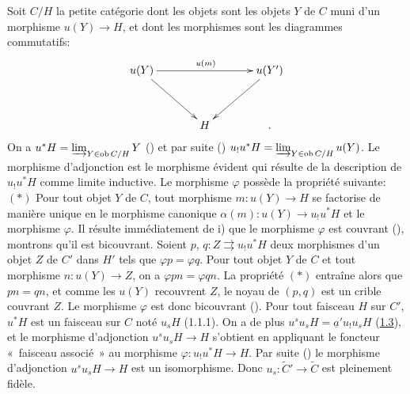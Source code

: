 \documentclass[10pt]{../fichiers-configuration-latex/smfart}
\begin{document}
Soit $C/H$ la petite catégorie dont les objets sont les objets
$Y$ de $C$ muni d'un morphisme $u(Y)\rightarrow H$, et dont les
morphismes sont les diagrammes commutatifs:
\[
\xymatrix@=1.25cm{
u(Y) \ar[rr]^{u(m)} \ar[rd]&     &u(Y')\ar[ld]\\
     &  H  & .
}
\]
On a $u^{\ast}H=\varinjlim_{Y\in \operatorname{ob} C/H} Y$ () et
par suite () $u_{!}u^{\ast}H=\varinjlim_{Y\in \operatorname{ob}
C/H} u(Y)$. Le morphisme d'adjonction est le morphisme évident qui
résulte de la description de $u_{!}u^{\ast}H$ comme limite
inductive. Le morphisme $\varphi$ possède la propriété\pageoriginale
suivante: $(\ast)$ Pour tout objet $Y$ de $C$, tout morphisme
$m:u(Y)\rightarrow H$ se factorise de manière unique en le morphisme
canonique $\alpha(m):u(Y)\rightarrow u_{!}u^{\ast}H$ et le morphisme
$\varphi$. Il résulte immédiatement de i) que le morphisme $\varphi$
est couvrant (), montrons qu'il est bicouvrant.
Soient $p$, $q:Z\rightrightarrows u_{!}u^{\ast}H$ deux morphismes
d'un objet $Z$ de $C'$ dans $H'$ tels que $\varphi p=\varphi q$.
Pour tout objet $Y$ de $C$ et tout morphisme $n:u(Y)\rightarrow Z$,
on a $\varphi pn=\varphi qn$. La propriété $(\ast)$ entraîne alors
que $pn=qn$, et comme les $u(Y)$ recouvrent $Z$, le noyau de $(p,q)$
est un crible couvrant $Z$. Le morphisme $\varphi$ est donc
bicouvrant (). Pour tout faisceau $H$ sur $C'$,
$u^{\ast}H$ est un faisceau sur $C$ noté $u_sH$ (1.1.1). On a de
plus $u^su_sH=\underline{a}'u_{!}u_sH$ (\hyperref[III.prop1.3]{1.3}), et le
morphisme d'adjonction $u^su_sH\rightarrow H$ s'obtient en
appliquant le foncteur « faisceau associé » au morphisme
$\varphi:u_{!}u^{\ast}H\rightarrow H$. Par suite ()
le morphisme d'adjonction $u^su_sH\rightarrow H$ est un
isomorphisme. Donc $u_s:\widetilde{C}'\rightarrow \widetilde{C}$ est
pleinement fidèle.
\end{document}
